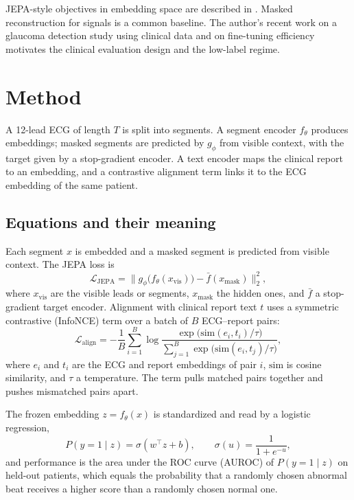 \documentclass[conference]{IEEEtran}
\begin{document}
JEPA-style objectives in embedding space are described in \cite{bardes2024vjepa}. Masked reconstruction for signals is a common baseline. The author's recent work on a glaucoma detection study using clinical data \cite{d2glaucoma} and on fine-tuning efficiency \cite{d10peft} motivates the clinical evaluation design and the low-label regime.

\section{Method}
A 12-lead ECG of length $T$ is split into segments. A segment encoder $f_\theta$ produces embeddings; masked segments are predicted by $g_\phi$ from visible context, with the target given by a stop-gradient encoder. A text encoder maps the clinical report to an embedding, and a contrastive alignment term links it to the ECG embedding of the same patient.

\subsection*{Equations and their meaning}
Each segment $x$ is embedded and a masked segment is predicted from visible context. The JEPA loss is
\begin{equation}
\mathcal{L}_{\mathrm{JEPA}}=\big\lVert g_\phi\big(f_\theta(x_{\mathrm{vis}})\big)-\bar f(x_{\mathrm{mask}})\big\rVert_2^2,
\end{equation}
where $x_{\mathrm{vis}}$ are the visible leads or segments, $x_{\mathrm{mask}}$ the hidden ones, and $\bar f$ a stop-gradient target encoder. Alignment with clinical report text $t$ uses a symmetric contrastive (InfoNCE) term over a batch of $B$ ECG--report pairs:
\begin{equation}
\mathcal{L}_{\mathrm{align}}=-\frac{1}{B}\sum_{i=1}^{B}\log\frac{\exp\big(\mathrm{sim}(e_i,t_i)/\tau\big)}{\sum_{j=1}^{B}\exp\big(\mathrm{sim}(e_i,t_j)/\tau\big)},
\end{equation}
where $e_i$ and $t_i$ are the ECG and report embeddings of pair $i$, $\mathrm{sim}$ is cosine similarity, and $\tau$ a temperature. The term pulls matched pairs together and pushes mismatched pairs apart.

The frozen embedding $z=f_\theta(x)$ is standardized and read by a logistic regression,
\begin{equation}
P(y=1\mid z)=\sigma(w^\top z+b),\qquad \sigma(u)=\frac{1}{1+e^{-u}},
\end{equation}
and performance is the area under the ROC curve (AUROC) of $P(y=1\mid z)$ on held-out patients, which equals the probability that a randomly chosen abnormal beat receives a higher score than a randomly chosen normal one.
\end{document}
